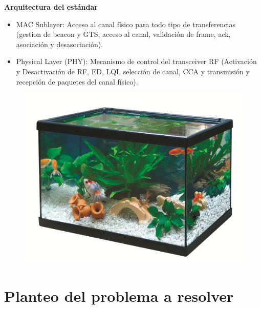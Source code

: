 \documentclass{beamer}
\begin{document}
\begin{frame}{\textbf{Arquitectura del estándar}}

\fontsize{14pt}{15}\selectfont
\begin{minipage}[c]{1.0\linewidth}
\begin{minipage}[c]{0.6\linewidth}
	\begin{itemize}
		\item MAC Sublayer: Acceso al canal físico para todo tipo de transferencias (gestion de beacon y GTS, acceso al canal, validación de frame, ack, asociación y desasociación). 
		\vspace{10px}
		\item Physical Layer (PHY): Mecanismo de control del transceiver RF (Activación y Desactivación de RF, ED, LQI, selección de canal, CCA y transmisión y recepción de paquetes del canal físico). 
		\vspace{10px}
  	\end{itemize}	
  \end{minipage}
  \begin{minipage}[c]{0.35\linewidth}
	\begin{figure}[H]
		{\includegraphics[width=1\textwidth]{./imagenes/acuario.jpg}}
	\end{figure}	  	  	
  \end{minipage}
\end{minipage}
\end{frame}


\section[Problema]{Planteo del problema a resolver}
\end{document}

